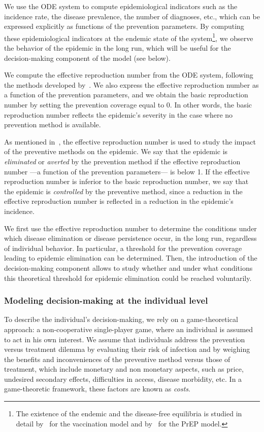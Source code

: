 We use the ODE system to compute epidemiological indicators such as the incidence rate, the disease prevalence, the number of diagnoses, etc., which can be expressed explicitly as functions of the prevention parameters. By computing these epidemiological indicators at the endemic state of the system\footnote{The existence of the endemic and the disease-free equilibria is studied in detail by~\citet{Hethcote2000} for the vaccination model and by~\citet{Jacquez1988} for the PrEP model.}, we observe the behavior of the epidemic in the long run, which will be useful for the decision-making component of the model (see below). 

We compute the effective reproduction number from the ODE system, following the methods developed by~\citet{VanDenDriessche2002}. We also express the effective reproduction number as a function of the prevention parameters, and we obtain the basic reproduction number by setting the prevention coverage equal to 0. In other words, the basic reproduction number reflects the epidemic's severity in the case where no prevention method is available. 

As mentioned in~, the effective reproduction number is used to study the impact of the preventive methods on the epidemic. We say that the epidemic is \textit{eliminated} or \textit{averted} by the prevention method if the effective reproduction number ---a function of the prevention parameters--- is below 1. If the effective reproduction number is inferior to the basic reproduction number, we say that the epidemic is \textit{controlled} by the preventive method, since a reduction in the effective reproduction number is reflected in a reduction in the epidemic's incidence.

We first use the effective reproduction number to determine the conditions under which disease elimination or disease persistence occur, in the long run, regardless of individual behavior. In particular, a threshold for the prevention coverage leading to epidemic elimination can be determined. Then, the introduction of the decision-making component allows to study whether and under what conditions this theoretical threshold for epidemic elimination could be reached voluntarily.

\subsubsection*{Modeling decision-making at the individual level}
To describe the individual's decision-making, we rely on a game-theoretical approach: a non-cooperative single-player game, where an individual is assumed to act in his own interest. We assume that individuals address the prevention versus treatment dilemma by evaluating their risk of infection and by weighing the benefits and inconveniences of the preventive method versus those of treatment, which include monetary and non monetary aspects, such as price, undesired secondary effects, difficulties in access, disease morbidity, etc. In a game-theoretic framework, these factors are known as {\it costs}. 

